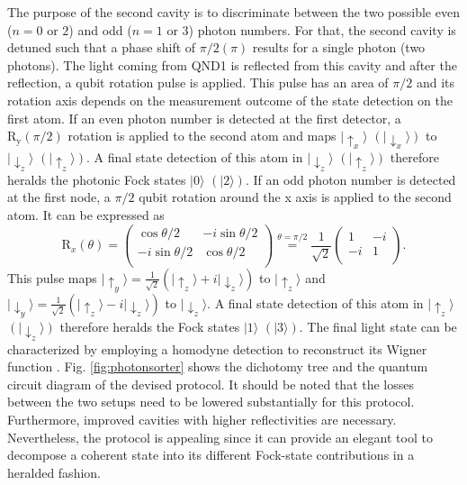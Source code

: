 \documentclass[prl,twocolumn,amsmath,amssymb,bibnotes,aps,longbibliography]{revtex4-1}
\newcommand{\ket}[1]{|{#1}\rangle}
\begin{document}
The purpose of the second cavity is to discriminate between the two possible even ($n=0$ or $2$) and odd ($n=1$ or $3$) photon numbers. For that, the second cavity is detuned \cite{hacker2019supplement} such that a phase shift of $\pi/2(\pi)$ results for a single photon (two photons). The light coming from QND1 is reflected from this cavity and after the reflection, a qubit rotation pulse is applied. This pulse has an area of $\pi/2$ and its rotation axis depends on the measurement outcome of the state detection on the first atom. If an even photon number is detected at the first detector, a $\text{R}_\text{y}(\pi/2)$ rotation is applied to the second atom and maps $\ket{\uparrow_x}$ $(\ket{\downarrow_x})$ to $\ket{\downarrow_z}$ $(\ket{\uparrow_z})$. A final state detection of this atom in $\ket{\downarrow_z}$ $(\ket{\uparrow_z})$ therefore heralds the photonic Fock states $\ket{0}$ $(\ket{2})$.
If an odd photon number is detected at the first node, a $\pi/2$ qubit rotation around the x axis is applied to the second atom. It can be expressed as 
\begin{equation}
\text{R}_x(\theta)=
\begin{pmatrix}\cos\theta/2 & -i\sin\theta/2 \\-i\sin\theta/2 & \cos\theta/2\\\end{pmatrix}\overset{\theta=\pi/2}{=}\frac{1}{\sqrt{2}}\begin{pmatrix}1 & -i \\-i & 1\\
\end{pmatrix}.
\end{equation}
This pulse maps $\ket{\uparrow_y}=\frac{1}{\sqrt{2}}(\ket{\uparrow_z}+i\ket{\downarrow_z})$ to $\ket{\uparrow_z}$ and $\ket{\downarrow_y}=\frac{1}{\sqrt{2}}(\ket{\uparrow_z}-i\ket{\downarrow_z})$ to $\ket{\downarrow_z}$. A final state detection of this atom in $\ket{\uparrow_z}$ $(\ket{\downarrow_z})$ therefore heralds the Fock states $\ket{1}$ $(\ket{3})$. The final light state can be characterized by employing a homodyne detection to reconstruct its Wigner function \cite{hacker2019supplement}.
Fig. \ref{fig:photonsorter} shows the dichotomy tree and the quantum circuit diagram of the devised protocol. It should be noted that the losses between the two setups need to be lowered substantially for this protocol. Furthermore, improved cavities with higher reflectivities are necessary. Nevertheless, the protocol is appealing since it can provide an elegant tool to decompose a coherent state into its different Fock-state contributions in a heralded fashion. 
\end{document}
